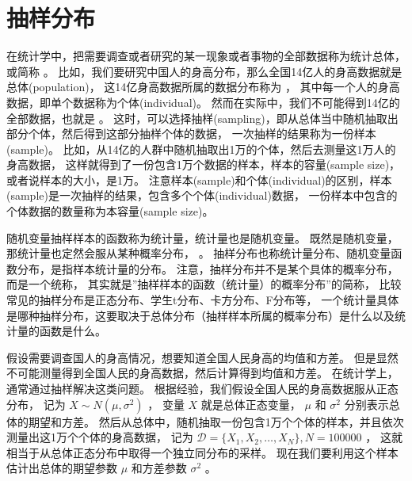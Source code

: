 \documentclass[letterpaper,10pt,english]{sphinxmanual}
\begin{document}
\section{抽样分布}
\label{\detokenize{_u63a8_u65ad_u4e0e_u68c0_u9a8c/content:ch-sample-distribution}}\label{\detokenize{_u63a8_u65ad_u4e0e_u68c0_u9a8c/content:id3}}
在统计学中，把需要调查或者研究的某一现象或者事物的全部数据称为统计总体，或简称 。
比如，我们要研究中国人的身高分布，那么全国14亿人的身高数据就是总体(population)，
这14亿身高数据所属的数据分布称为 ，
其中每一个人的身高数据，即单个数据称为个体(individual)。
然而在实际中，我们不可能得到14亿的全部数据，也就是  。
这时，可以选择抽样(sampling)，即从总体当中随机抽取出部分个体，然后得到这部分抽样个体的数据，
一次抽样的结果称为一份样本(sample)。
比如，从14亿的人群中随机抽取出1万的个体，然后去测量这1万人的身高数据，
这样就得到了一份包含1万个数据的样本，样本的容量(sample size)，或者说样本的大小，是1万。
注意样本(sample)和个体(individual)的区别，样本(sample)是一次抽样的结果，包含多个个体(individual)数据，
一份样本中包含的个体数据的数量称为本容量(sample size)。

随机变量抽样样本的函数称为统计量，统计量也是随机变量。
既然是随机变量，那统计量也定然会服从某种概率分布，
。
抽样分布也称统计量分布、随机变量函数分布，是指样本统计量的分布。
注意，抽样分布并不是某个具体的概率分布，而是一个统称，
其实就是”抽样样本的函数（统计量）的概率分布”的简称，
比较常见的抽样分布是正态分布、学生t分布、卡方分布、F分布等，
一个统计量具体是哪种抽样分布，这要取决于总体分布（抽样样本所属的概率分布）是什么以及统计量的函数是什么。

假设需要调查国人的身高情况，想要知道全国人民身高的均值和方差。
但是显然不可能测量得到全国人民的身高数据，然后计算得到均值和方差。
在统计学上，通常通过抽样解决这类问题。
根据经验，我们假设全国人民的身高数据服从正态分布，
记为 \(X \sim N(\mu,\sigma^2)\) ，
变量 \(X\) 就是总体正态变量，
\(\mu\) 和 \(\sigma^2\) 分别表示总体的期望和方差。
然后从总体中，随机抽取一份包含1万个个体的样本，并且依次测量出这1万个个体的身高数据，
记为 \(\mathcal{D}=\{X_1,X_2,\dots,X_N \},N=100000\) ，
这就相当于从总体正态分布中取得一个独立同分布的采样。
现在我们要利用这个样本估计出总体的期望参数 \(\mu\) 和方差参数 \(\sigma^2\)
。
\end{document}
